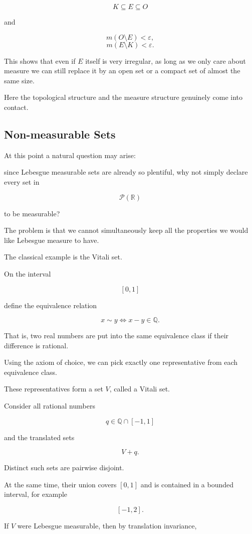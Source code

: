 \documentclass[11pt]{article}
\begin{document}
\[
K\subseteq E\subseteq O
\]

and

\[
m(O\setminus E)<\varepsilon,
\]
\[
m(E\setminus K)<\varepsilon.
\]

This shows that even if $E$ itself is very irregular, as long as we only care about measure we can still replace it by an open set or a compact set of almost the same size.

Here the topological structure and the measure structure genuinely come into contact.

\subsection{Non-measurable Sets}

At this point a natural question may arise:

since Lebesgue measurable sets are already so plentiful, why not simply declare every set in

\[
\mathcal{P}(\mathbb{R})
\]

to be measurable?

The problem is that we cannot simultaneously keep all the properties we would like Lebesgue measure to have.

The classical example is the Vitali set.

On the interval

\[
[0,1]
\]

define the equivalence relation

\[
x\sim y\Longleftrightarrow x-y\in\mathbb{Q}.
\]

That is, two real numbers are put into the same equivalence class if their difference is rational.

Using the axiom of choice, we can pick exactly one representative from each equivalence class.

These representatives form a set $V$, called a Vitali set.

Consider all rational numbers

\[
q\in\mathbb{Q}\cap[-1,1]
\]

and the translated sets

\[
V+q.
\]

Distinct such sets are pairwise disjoint.

At the same time, their union covers $[0,1]$ and is contained in a bounded interval, for example

\[
[-1,2].
\]

If $V$ were Lebesgue measurable, then by translation invariance,
\end{document}
